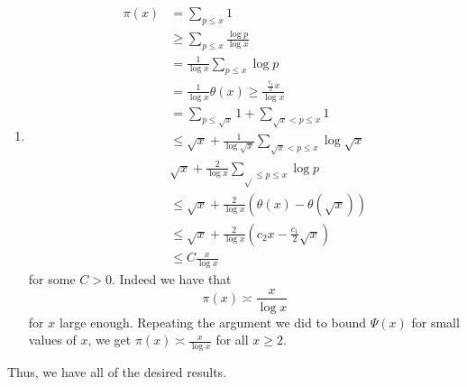 \documentclass[12pt]{article}
\begin{document}
{\begin{enumerate}
\begin{align*}
            \theta(x)&\geq\Psi(x)-(\log x)\sqrt{x}\\
            &\geq c_1x-(\log x)\sqrt{x}
        \end{align*}
        for $x$ large enough we have
        \[
            (\log x)\sqrt{x}\leq\frac{c_1}{2}x
        \]
        and so 
        \[
            \theta(x)\geq c_1x-\frac{c_1}{2}x=\frac{c_1}{2}x.
        \]
        \item[(3)] 
        \begin{align*}
            \pi(x)&=\sum_{p\leq x}1\\
            &\geq\sum_{p\leq x}\frac{\log p}{\log x}\\
            &=\frac{1}{\log x}\sum_{p\leq x}\log p\\
            &=\frac{1}{\log x}\theta(x)\geq\frac{\frac{c_1}{x}x}{\log x}\\
            &=\sum_{p\leq\sqrt{x}}1+\sum_{\sqrt{x}<p\leq x}1\\
            &\leq\sqrt{x}+\frac{1}{\log\sqrt{x}}\sum_{\sqrt{x}<p\leq x}\log\sqrt{x}\\
            &\sqrt{x}+\frac{2}{\log x}\sum_{\sqrt{}\leq p\leq x}\log p\\
            &\leq\sqrt{x}+\frac{2}{\log x}(\theta(x)-\theta(\sqrt{x}))\\
            &\leq\sqrt{x}+\frac{2}{\log x}(c_2x-\frac{c_1}{2}\sqrt{x})\\
            &\leq C\frac{x}{\log x}
        \end{align*}
        for some $C>0$. Indeed we have that 
        \[
            \pi(x)\asymp\frac{x}{\log x}
        \]
        for $x$ large enough. Repeating the argument we did to bound $\Psi(x)$ for small values of $x$, we get $\pi(x)\asymp\frac{x}{\log x}$ for all $x\geq 2$. 
    \end{enumerate}
    Thus, we have all of the desired results.
}
\end{document}
